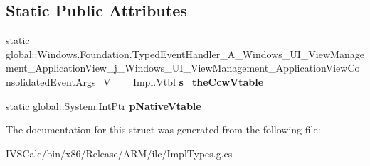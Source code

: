 \subsection*{Static Public Attributes}
\begin{DoxyCompactItemize}
\item 
\mbox{\label{struct_windows_1_1_foundation_1_1_typed_event_handler___a___windows___u_i___view_management___ap72530f67d076325c92c48b027e090fa9_a7dc4810bc501d5930c677010d5f152ed}} 
static global\+::\+Windows.\+Foundation.\+Typed\+Event\+Handler\+\_\+\+A\+\_\+\+Windows\+\_\+\+U\+I\+\_\+\+View\+Management\+\_\+\+Application\+View\+\_\+j\+\_\+\+Windows\+\_\+\+U\+I\+\_\+\+View\+Management\+\_\+\+Application\+View\+Consolidated\+Event\+Args\+\_\+\+V\+\_\+\+\_\+\+\_\+\+Impl.\+Vtbl {\bfseries s\+\_\+the\+Ccw\+Vtable}
\item 
\mbox{\label{struct_windows_1_1_foundation_1_1_typed_event_handler___a___windows___u_i___view_management___ap72530f67d076325c92c48b027e090fa9_ac5ff60bf0cc18f5d45d08d589813e2e6}} 
static global\+::\+System.\+Int\+Ptr {\bfseries p\+Native\+Vtable}
\end{DoxyCompactItemize}


The documentation for this struct was generated from the following file\+:\begin{DoxyCompactItemize}
\item 
I\+V\+S\+Calc/bin/x86/\+Release/\+A\+R\+M/ilc/Impl\+Types.\+g.\+cs\end{DoxyCompactItemize}
